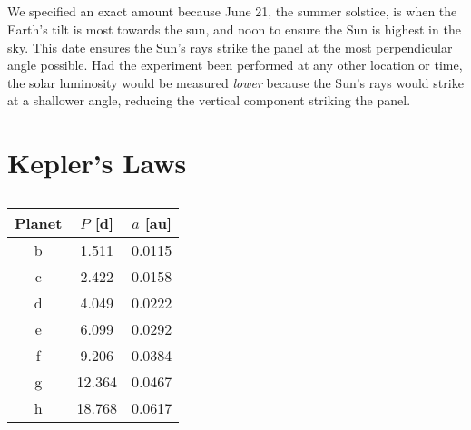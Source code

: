 \documentclass{article}
\begin{document}
\subsection{}

We specified an exact amount because June 21, the summer solstice, is when the Earth's tilt is most towards the sun, and noon to ensure the Sun is highest in the sky.
This date ensures the Sun's rays strike the panel at the most perpendicular angle possible.
Had the experiment been performed at any other location or time, the solar luminosity would be measured \emph{lower} because the Sun's rays would strike at a shallower angle, reducing the vertical component striking the panel.

\section{Kepler's Laws}

\subsection{}

\begin{center}
\begin{tabular}{||c|c|c||}
    \hline
    \textbf{Planet} & \(P\) [\si{\day}] & \(a\) [\si{\astronomicalunit}] \\
    \hline
    b & 1.511 & 0.0115 \\
    c & 2.422 & 0.0158 \\
    d & 4.049 & 0.0222 \\
    e & 6.099 & 0.0292 \\
    f & 9.206 & 0.0384 \\
    g & 12.364 & 0.0467 \\
    h & 18.768 & 0.0617 \\
    \hline
\end{tabular} \\
\end{center} 
\end{document}
